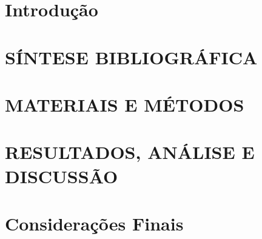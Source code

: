 \documentclass[12pt,oneside,a4paper,chapter=TITLE, english, french,	spanish, brazil]{abntex2-logatti}
\begin{document}


\setcounter{tocdepth}{0}
\tableofcontents
\cleardoublepage



\textual

\chapter*[Introdução]{Introdução}
%

\cleardoublepage
\chapter{SÍNTESE BIBLIOGRÁFICA}

\cleardoublepage
\chapter{MATERIAIS E MÉTODOS}


\chapter{RESULTADOS, ANÁLISE E DISCUSSÃO}


\chapter*[Considerações Finais]{Considerações Finais}





\postextual
\end{document}
